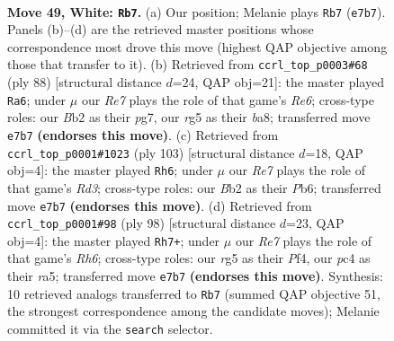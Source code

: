 \documentclass[11pt]{article}
\begin{document}
\clearpage

\begin{figure}[p]\centering
\begin{subfigure}{0.46\textwidth}\centering
\resizebox{\linewidth}{!}{%
\newchessgame
\chessboard[
  setfen={5k2/4R3/8/pp4r1/b1p5/P1P5/1B3K2/8 w - - 4 49},
  showmover=false,
  pgfstyle=straightmove, color=movearrow, markmove={e7-b7}
]}
\caption{}
\end{subfigure}\hfill
\begin{subfigure}{0.46\textwidth}\centering
\resizebox{\linewidth}{!}{%
\newchessgame
\chessboard[
  setfen={b1r5/5kp1/4R2p/2B5/1P3p1P/8/5P1K/8 w - - 1 45},
  showmover=false,
  pgfstyle=straightmove, color=movearrow, markmove={e6-a6}
]}
\caption{}
\end{subfigure}
\\[4pt]
\begin{subfigure}{0.46\textwidth}\centering
\resizebox{\linewidth}{!}{%
\newchessgame
\chessboard[
  setfen={5k2/2R5/1p1r4/pB3Kp1/2P5/1P2b2P/8/8 b - - 6 52},
  showmover=false,
  pgfstyle=straightmove, color=movearrow, markmove={d6-h6}
]}
\caption{}
\end{subfigure}\hfill
\begin{subfigure}{0.46\textwidth}\centering
\resizebox{\linewidth}{!}{%
\newchessgame
\chessboard[
  setfen={8/2k5/7R/r4p2/1p1p1P2/1Bb3K1/P7/8 w - - 2 50},
  showmover=false,
  pgfstyle=straightmove, color=movearrow, markmove={h6-h7}
]}
\caption{}
\end{subfigure}
\caption{\textbf{Move 49, White: \texttt{Rb7}.} (a) Our position; Melanie plays \texttt{Rb7} (\texttt{e7b7}). Panels (b)--(d) are the retrieved master positions whose correspondence most drove this move (highest QAP objective among those that transfer to it). (b) Retrieved from \texttt{ccrl\_top\_p0003\#68} (ply 88) [structural distance $d$=24, QAP obj=21]: the master played \texttt{Ra6}; under $\mu$ our \emph{Re7} plays the role of that game's \emph{Re6}; cross-type roles: our \emph{B}b2 as their \emph{p}g7, our \emph{r}g5 as their \emph{b}a8; transferred move \texttt{e7b7} \textbf{(endorses this move)}. (c) Retrieved from \texttt{ccrl\_top\_p0001\#1023} (ply 103) [structural distance $d$=18, QAP obj=4]: the master played \texttt{Rh6}; under $\mu$ our \emph{Re7} plays the role of that game's \emph{Rd3}; cross-type roles: our \emph{B}b2 as their \emph{P}b6; transferred move \texttt{e7b7} \textbf{(endorses this move)}. (d) Retrieved from \texttt{ccrl\_top\_p0001\#98} (ply 98) [structural distance $d$=23, QAP obj=4]: the master played \texttt{Rh7+}; under $\mu$ our \emph{Re7} plays the role of that game's \emph{Rh6}; cross-type roles: our \emph{r}g5 as their \emph{P}f4, our \emph{p}c4 as their \emph{r}a5; transferred move \texttt{e7b7} \textbf{(endorses this move)}. Synthesis: 10 retrieved analogs transferred to \texttt{Rb7} (summed QAP objective 51, the strongest correspondence among the candidate moves); Melanie committed it via the \texttt{search} selector.}
\label{fig:thought-m96}
\end{figure}
\end{document}
